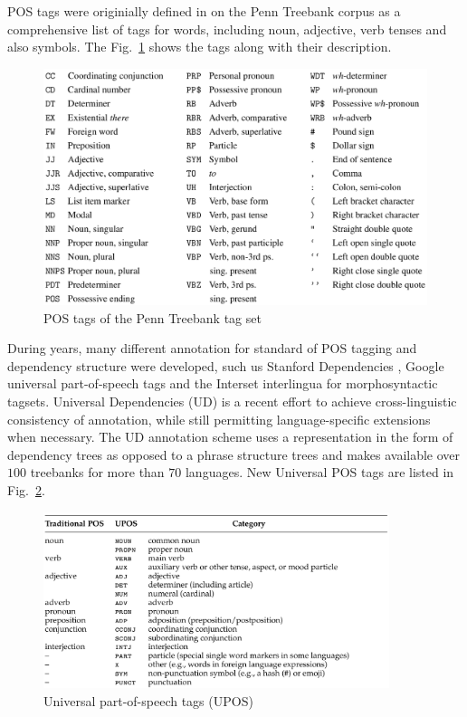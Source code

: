 POS tags were originially defined in \cite{marcus1993building} on the
Penn Treebank corpus as a comprehensive list of tags for words,
including noun, adjective, verb tenses and also symbols. The
Fig.~\ref{fig:pos-tags} shows the tags along with their description.

\begin{figure}
  \centering
  \includegraphics[width=.8\textwidth]{figures/pos-tags.png}
  \caption[POS tags]{POS tags of the Penn Treebank tag set \cite{marcus1993building}}
  \label{fig:pos-tags}
\end{figure}

During years, many different annotation for standard of POS tagging
and dependency structure were developed, such us Stanford Dependencies
\cite{de2006generating, de2008stanford, silveira2014gold}, Google
universal part-of-speech tags \cite{lin2012syntactic} and the Interset
interlingua \cite{zeman2008reusable} for morphosyntactic tagsets.
Universal Dependencies (UD) \cite{nivre2016universal,
nivre2017universal} is a recent effort to achieve cross-linguistic
consistency of annotation, while still permitting language-specific
extensions when necessary. The UD annotation scheme uses a
representation in the form of dependency trees as opposed to a phrase
structure trees and makes available over $100$ treebanks for more than
$70$ languages. New Universal POS tags are listed in
Fig.~\ref{fig:upos-tags}.

\begin{figure}
  \centering
  \includegraphics[width=0.9\textwidth]{figures/upos-tags.png}
  \caption[Universal POS tags]{Universal part-of-speech tags (UPOS) \cite{nivre2017universal}}
  \label{fig:upos-tags}
\end{figure}
 
